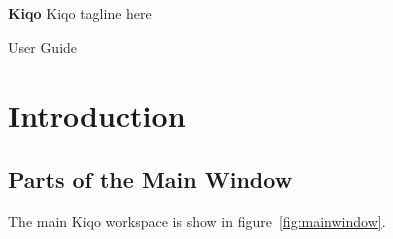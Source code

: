 \documentclass[11pt,fleqn]{book} %
\begin{document}

\begingroup
\thispagestyle{empty}
\centering
\vspace*{5cm}
\par\normalfont\fontsize{35}{35}\sffamily\selectfont
\textbf{Kiqo}
{\LARGE Kiqo tagline here}\par %
\vspace*{1cm}
{\Huge User Guide}\par %
\endgroup


\tableofcontents %


\chapter{Introduction}

\section{Parts of the Main Window}
The main Kiqo workspace is show in figure~\ref{fig:mainwindow}.
\end{document}
